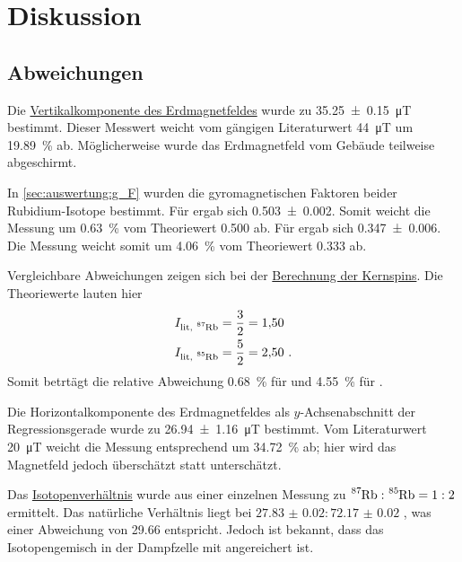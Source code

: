 \section{Diskussion}
\label{sec:diskussion}

\subsection{Abweichungen}

Die \hyperref[sec:auswertung:B_erd_vert]{Vertikalkomponente des Erdmagnetfeldes}
wurde zu \SI{35.25 \pm 0.15}{\micro\tesla} bestimmt.
Dieser Messwert weicht vom gängigen Literaturwert \SI{44}{\micro\tesla} \cite{erdmagnetfeld}
um \SI{19.89}{\percent} ab.
Möglicherweise wurde das Erdmagnetfeld vom Gebäude teilweise abgeschirmt.


In \autoref{sec:auswertung:g_F} wurden die gyromagnetischen Faktoren beider Rubidium-Isotope bestimmt.
Für  ergab sich \num{0.503 \pm 0.002}.
Somit weicht die Messung um \SI{0.63}{\percent} vom Theoriewert \num{0.500} ab.
Für  ergab sich \num{0.347 \pm 0.006}.
Die Messung weicht somit um \SI{4.06}{\percent} vom Theoriewert \num{0.333} ab.


Vergleichbare Abweichungen zeigen sich bei der \hyperref[sec:auswertung:kernspin]{Berechnung der Kernspins}.
Die Theoriewerte lauten hier
\begin{align*}
    I_\text{lit, \Rb{87}} &= \frac{3}{2} = \num{1.50} \\
    I_\text{lit, \Rb{85}} &= \frac{5}{2} = \num{2.50} \ .
\end{align*}
Somit betrtägt die relative Abweichung
\SI{0.68}{\percent} für  und
\SI{4.55}{\percent} für .


Die Horizontalkomponente des Erdmagnetfeldes
als $y$-Achsenabschnitt der Regressionsgerade
wurde zu \SI{26.94 \pm 1.16}{\micro\tesla} bestimmt.
Vom Literaturwert \SI{20}{\micro\tesla} \cite{erdmagnetfeld}
weicht die Messung entsprechend um \SI{34.72}{\percent} ab;
hier wird das Magnetfeld jedoch überschätzt statt unterschätzt.


Das \hyperref[sec:auswertung:isotopenverhaeltnis]{Isotopenverhältnis}
wurde aus einer einzelnen Messung zu
\def\verh#1#2{#1 : #2}
$\verh{\Rb{87}}{\Rb{85}} = \verh{1}{2}$
ermittelt.
Das natürliche Verhältnis liegt bei
$\verh{\num{27.83(2)}}{\num{72.17(2)}}$ \cite{isotopenverhaeltnis},
was einer Abweichung von \SI{29.66}{\percengt} entspricht.
Jedoch ist bekannt, dass das Isotopengemisch in der Dampfzelle mit  angereichert ist.


